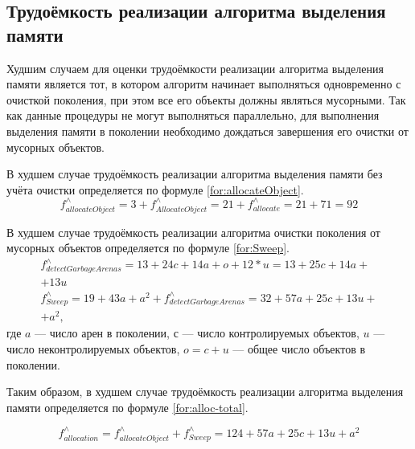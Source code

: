 \subsection{Трудоёмкость реализации алгоритма выделения памяти}

Худшим случаем для оценки трудоёмкости реализации алгоритма выделения памяти является тот, в котором алгоритм начинает выполняться одновременно с очисткой поколения, при этом все его объекты должны являться мусорными. Так как данные процедуры не могут выполняться параллельно, для выполнения выделения памяти в поколении необходимо дождаться завершения его очистки от мусорных объектов.

В худшем случае трудоёмкость реализации алгоритма выделения памяти без учёта очистки определяется по формуле \ref{for:allocateObject}.
\begin{equation}
	\label{for:allocateObject}
	f_{allocateObject}^{\wedge} = 3 + f_{AllocateObject}^{\wedge} = 21 + f_{allocate}^{\wedge} = 21 + 71 = 92
\end{equation}

В худшем случае трудоёмкость реализации алгоритма очистки поколения от мусорных объектов определяется по формуле \ref{for:Sweep}.
\begin{equation}
	\label{for:Sweep}
	\begin{array}{l}
		f_{detectGarbageArenas}^{\wedge} = 13 + 24c + 14a + o + 12*u = 13 + 25c + 14a +\\+ 13u\\
		f_{Sweep}^{\wedge} = 19 + 43a + a^2 + f_{detectGarbageArenas}^{\wedge} = 32 + 57a + 25c + 13u +\\+ a^2,
	\end{array}
\end{equation}
где $a$ --- число арен в поколении, $с$ --- число контролируемых объектов, $u$ --- число неконтролируемых объектов, $o = c + u$ --- общее число объектов в поколении.

Таким образом, в худшем случае трудоёмкость реализации алгоритма выделения памяти определяется по формуле \ref{for:alloc-total}.

\begin{equation}
	\label{for:alloc-total}
	f_{allocation}^{\wedge} = f_{allocateObject}^{\wedge} + f_{Sweep}^{\wedge} = 124 + 57a + 25c + 13u + a^2
\end{equation}



